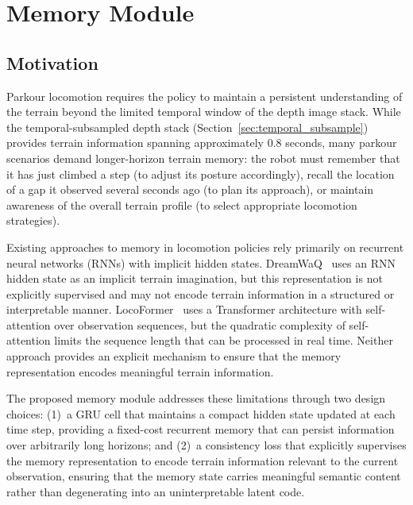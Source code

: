 \section{Memory Module}
\label{sec:memory_module}

\subsection{Motivation}

Parkour locomotion requires the policy to maintain a persistent understanding of the terrain beyond the limited temporal window of the depth image stack. While the temporal-subsampled depth stack (Section~\ref{sec:temporal_subsample}) provides terrain information spanning approximately 0.8 seconds, many parkour scenarios demand longer-horizon terrain memory: the robot must remember that it has just climbed a step (to adjust its posture accordingly), recall the location of a gap it observed several seconds ago (to plan its approach), or maintain awareness of the overall terrain profile (to select appropriate locomotion strategies).

Existing approaches to memory in locomotion policies rely primarily on recurrent neural networks (RNNs) with implicit hidden states. DreamWaQ~\cite{nahraendra2024dreamwaq} uses an RNN hidden state as an implicit terrain imagination, but this representation is not explicitly supervised and may not encode terrain information in a structured or interpretable manner. LocoFormer~\cite{liu2024locoformer} uses a Transformer architecture with self-attention over observation sequences, but the quadratic complexity of self-attention limits the sequence length that can be processed in real time. Neither approach provides an explicit mechanism to ensure that the memory representation encodes meaningful terrain information.

The proposed memory module addresses these limitations through two design choices: (1)~a GRU cell that maintains a compact hidden state updated at each time step, providing a fixed-cost recurrent memory that can persist information over arbitrarily long horizons; and (2)~a consistency loss that explicitly supervises the memory representation to encode terrain information relevant to the current observation, ensuring that the memory state carries meaningful semantic content rather than degenerating into an uninterpretable latent code.

